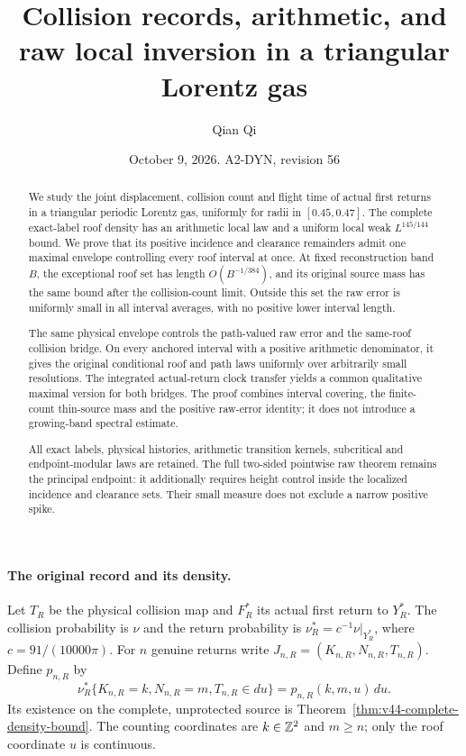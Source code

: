 \documentclass[11pt,reqno]{amsart}
\title[Collision records and raw local inversion]{Collision records, arithmetic, and raw local inversion in a triangular Lorentz gas}
\author{Qian Qi}
\date{October 9, 2026. A2-DYN, revision 56}
\numberwithin{equation}{section}
\theoremstyle{definition}\newtheorem{definition}[theorem]{Definition}
\theoremstyle{remark}\newtheorem{remark}[theorem]{Remark}
\begin{document}
\raggedbottom
\begin{abstract}
We study the joint displacement, collision count and flight time of
actual first returns in a triangular periodic Lorentz gas, uniformly
for radii in $[0.45,0.47]$. The complete exact-label roof density has
an arithmetic local law and a uniform local weak $L^{145/144}$ bound.
We prove that its positive incidence and clearance remainders admit
one maximal envelope controlling every roof interval at once. At
fixed reconstruction band $B$, the exceptional roof set has length
$O(B^{-1/384})$, and its original source mass has the same bound after
the collision-count limit. Outside this set the raw error is uniformly
small in all interval averages, with no positive lower interval length.

The same physical envelope controls the path-valued raw error and
the same-roof collision bridge. On every anchored interval with a
positive arithmetic denominator, it gives the original conditional
roof and path laws uniformly over arbitrarily small resolutions.
The integrated actual-return clock transfer yields a common qualitative
maximal version for both bridges. The proof combines interval covering,
the finite-count thin-source mass and the positive raw-error identity;
it does not introduce a growing-band spectral estimate.

All exact labels, physical histories, arithmetic transition kernels,
subcritical and endpoint-modular laws are retained. The full two-sided
pointwise raw theorem remains the principal endpoint: it additionally
requires height control inside the localized incidence and clearance
sets. Their small measure does not exclude a narrow positive spike.
\end{abstract}
\maketitle

\paragraph{The original record and its density.}
Let $T_R$ be the physical collision map and $F_R^*$ its actual first
return to $Y_R^*$. The collision probability is $\nu$ and the return
probability is $\nu_R^*=c^{-1}\nu|_{Y_R^*}$, where
$c=91/(10000\pi)$. For $n$ genuine returns write
$J_{n,R}=(K_{n,R},N_{n,R},T_{n,R})$. Define $p_{n,R}$ by
\[
 \nu_R^*\{K_{n,R}=k,N_{n,R}=m,T_{n,R}\in du\}
                  =p_{n,R}(k,m,u)\,du.
\]
Its existence on the complete, unprotected source is
Theorem~\ref{thm:v44-complete-density-bound}. The counting coordinates
are $k\in\mathbb Z^2$ and $m\ge n$; only the roof coordinate $u$ is continuous.
\end{document}
